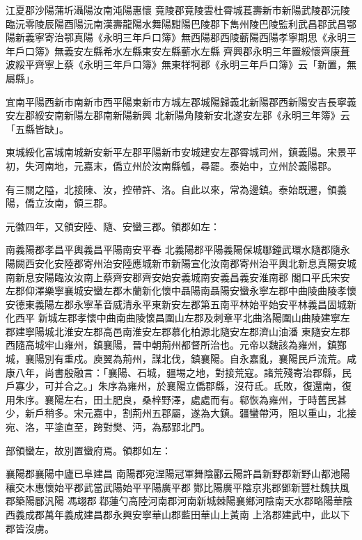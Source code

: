 \begin{pinyinscope}
 江夏郡沙陽蒲圻灄陽汝南沌陽惠懷
 竟陵郡竟陵雲杜霄城萇壽新市新陽武陵郡沅陵臨沅零陵辰陽酉陽沅南漢壽龍陽水舞陽黚陽巴陵郡下雋州陵巴陵監利武昌郡武昌鄂陽新義寧寄治鄂真陽《永明三年戶口簿》無西陽郡西陵蘄陽西陽孝寧期思《永明三年戶口簿》無義安左縣希水左縣東安左縣蘄水左縣
 齊興郡永明三年置綏懷齊康葺波綏平齊寧上蔡《永明三年戶口簿》無東䍧牱郡《永明三年戶口簿》云「新置，無屬縣」。



 宜南平陽西新市南新市西平陽東新市方城左郡城陽歸義北新陽郡西新陽安吉長寧義安左郡綏安南新陽左郡南新陽新興
 北新陽角陵新安北遂安左郡《永明三年簿》云「五縣皆缺」。



 東城綏化富城南城新安新平左郡平陽新市安城建安左郡霄城司州，鎮義陽。宋景平初，失河南地，元嘉末，僑立州於汝南縣瓠，尋罷。泰始中，立州於義陽郡。



 有三關之隘，北接陳、汝，控帶許、洛。自此以來，常為邊鎮。泰始既遷，領義陽，僑立汝南，領三郡。



 元徽四年，又領安陸、隨、安蠻三郡。領郡如左：



 南義陽郡孝昌平輿義昌平陽南安平春
 北義陽郡平陽義陽保城鄳鐘武環水隨郡隨永陽闕西安化安陸郡寄州治安陸應城新市新陽宣化汝南郡寄州治平輿北新息真陽安城南新息安陽臨汝汝南上蔡齊安郡齊安始安義城南安義昌義安淮南郡
 閣口平氏宋安左郡仰澤樂寧襄城安蠻左郡木蘭新化懷中聶陽南聶陽安蠻永寧左郡中曲陵曲陵孝懷安德東義陽左郡永寧革音威清永平東新安左郡第五南平林始平始安平林義昌固城新化西平
 新城左郡孝懷中曲南曲陵懷昌圍山左郡及刺章平北曲洛陽圍山曲陵建寧左郡建寧陽城北淮安左郡高邑南淮安左郡慕化柏源北隨安左郡濟山油潘
 東隨安左郡西隨高城牢山雍州，鎮襄陽，晉中朝荊州都督所治也。元帝以魏該為雍州，鎮酂城，襄陽別有重戍。庾翼為荊州，謀北伐，鎮襄陽。自永嘉亂，襄陽民戶流荒。咸康八年，尚書殷融言：「襄陽、石城，疆埸之地，對接荒寇。諸荒殘寄治郡縣，民戶寡少，可并合之。」朱序為雍州，於襄陽立僑郡縣，沒苻氐。氐敗，復還南，復用朱序。襄陽左右，田土肥良，桑梓野澤，處處而有。郗恢為雍州，于時舊民甚少，新戶稍多。宋元嘉中，割荊州五郡屬，遂為大鎮。疆蠻帶沔，阻以重山，北接宛、洛，平塗直至，跨對樊、沔，為鄢郢北門。



 部領蠻左，故別置蠻府焉。領郡如左：



 襄陽郡襄陽中廬已阜建昌
 南陽郡宛涅陽冠軍舞陰酈云陽許昌新野郡新野山都池陽穰交木惠懷始平郡武當武陽始平平陽廣平郡酂比陽廣平陰京兆郡鄧新豐杜魏扶風郡築陽郿汎陽
 馮翊郡鄀蓮勺高陸河南郡河南新城棘陽襄鄉河陰南天水郡略陽華陰西義成郡萬年義成建昌郡永興安寧華山郡藍田華山上黃南
 上洛郡建武中，此以下郡皆沒虜。




\end{pinyinscope}
